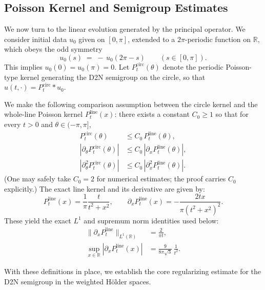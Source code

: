 \documentclass{amsart}
\begin{document}
\subsection{Poisson Kernel and Semigroup Estimates}

We now turn to the linear evolution generated by the principal operator. We consider initial data \(u_0\) given on \([0,\pi]\), extended to a \(2\pi\)-periodic function on \(\mathbb R\), which obeys the odd symmetry
\[
u_0(s)\;=\;-\,u_0(2\pi-s)\qquad(s\in[0,\pi]).
\]
This implies \(u_0(0)=u_0(\pi)=0\). Let \(P^{\mathrm{circ}}_t(\theta)\) denote the periodic Poisson-type kernel generating the D2N semigroup on the circle, so that \(u(t,\cdot)=P^{\mathrm{circ}}_t*u_0\). 

We make the following comparison assumption between the circle kernel and the whole-line Poisson kernel $P^{\mathrm{line}}_t(x)$: there exists a constant \(C_0\ge1\) so that for every \(t>0\) and \(\theta\in(-\pi,\pi]\),
\begin{equation}\label{E:kernel-compare}
\begin{aligned}
P^{\mathrm{circ}}_t(\theta) &\le C_0\,P^{\mathrm{line}}_t(\theta),\\
|{\partial_\theta}P^{\mathrm{circ}}_t(\theta)| &\le C_0\,|{\partial_x}P^{\mathrm{line}}_t(\theta)|,\\
|{\partial_\theta^2}P^{\mathrm{circ}}_t(\theta)| &\le C_0\,|{\partial_x^2}P^{\mathrm{line}}_t(\theta)|.
\end{aligned}
\end{equation}
(One may safely take \(C_0=2\) for numerical estimates; the proof carries \(C_0\) explicitly.) The exact line kernel and its derivative are given by:
\[
P^{\mathrm{line}}_t(x)=\frac{1}{\pi}\frac{t}{t^2+x^2},\qquad
\partial_x P^{\mathrm{line}}_t(x)=-\frac{2t x}{\pi (t^2+x^2)^2}.
\]
These yield the exact \(L^1\) and supremum norm identities used below:
\begin{align}
\|\partial_x P^{\mathrm{line}}_t\|_{L^1(\mathbb R)}
&=\frac{2}{\pi t}, \label{E:P1-L1}\\
\sup_{x\in\mathbb R}|\partial_x P^{\mathrm{line}}_t(x)|
&=\frac{9}{8\pi\sqrt3}\,\frac{1}{t^2} .\label{E:P1-sup}
\end{align}

With these definitions in place, we establish the core regularizing estimate for the D2N semigroup in the weighted Hölder spaces.
\end{document}
